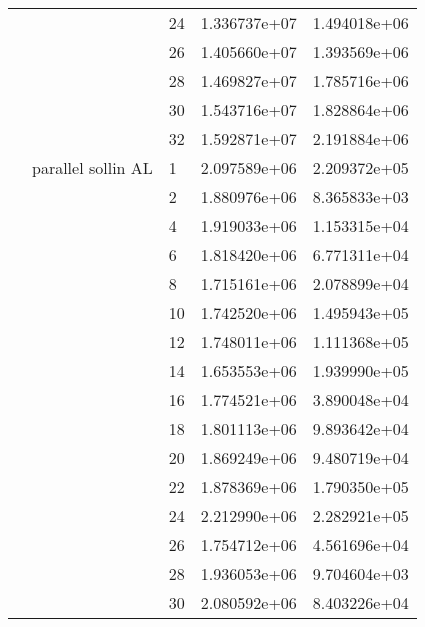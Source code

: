 \begin{tabular}{lllrr}
                      &                     & 24 &  1.336737e+07 &  1.494018e+06 \\
                      &                     & 26 &  1.405660e+07 &  1.393569e+06 \\
                      &                     & 28 &  1.469827e+07 &  1.785716e+06 \\
                      &                     & 30 &  1.543716e+07 &  1.828864e+06 \\
                      &                     & 32 &  1.592871e+07 &  2.191884e+06 \\
                      & parallel sollin AL & 1  &  2.097589e+06 &  2.209372e+05 \\
                      &                     & 2  &  1.880976e+06 &  8.365833e+03 \\
                      &                     & 4  &  1.919033e+06 &  1.153315e+04 \\
                      &                     & 6  &  1.818420e+06 &  6.771311e+04 \\
                      &                     & 8  &  1.715161e+06 &  2.078899e+04 \\
                      &                     & 10 &  1.742520e+06 &  1.495943e+05 \\
                      &                     & 12 &  1.748011e+06 &  1.111368e+05 \\
                      &                     & 14 &  1.653553e+06 &  1.939990e+05 \\
                      &                     & 16 &  1.774521e+06 &  3.890048e+04 \\
                      &                     & 18 &  1.801113e+06 &  9.893642e+04 \\
                      &                     & 20 &  1.869249e+06 &  9.480719e+04 \\
                      &                     & 22 &  1.878369e+06 &  1.790350e+05 \\
                      &                     & 24 &  2.212990e+06 &  2.282921e+05 \\
                      &                     & 26 &  1.754712e+06 &  4.561696e+04 \\
                      &                     & 28 &  1.936053e+06 &  9.704604e+03 \\
                      &                     & 30 &  2.080592e+06 &  8.403226e+04 \\

\end{tabular}
